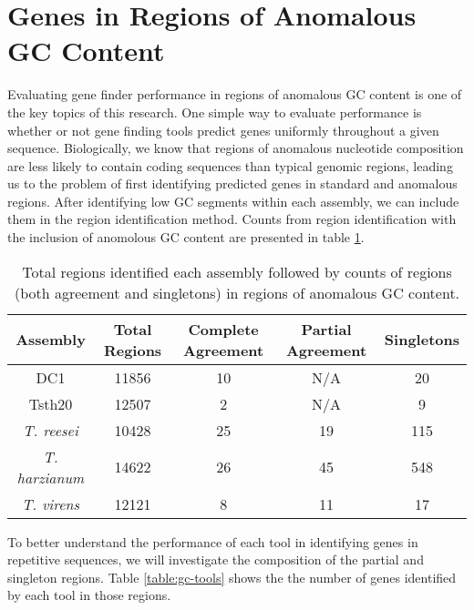 \section{Genes in Regions of Anomalous GC Content}

Evaluating gene finder performance in regions of anomalous GC content
is one of the key topics of this research. One simple way to evaluate
performance is whether or not gene finding tools predict genes
uniformly throughout a given sequence. Biologically, we know that
regions of anomalous nucleotide composition are less likely to contain
coding sequences than typical genomic regions, leading us to the
problem of first identifying predicted genes in standard and anomalous
regions. After identifying low GC segments within each assembly, we
can include them in the region identification method. Counts from
region identification with the inclusion of anomolous GC content are
presented in table \ref{table:gc-regions}.

\begin{table}[h!]
  \begin{center}
    \begin{tabular}{|c|c|c|c|c|}
      \hline
      Assembly & Total Regions & Complete Agreement & Partial Agreement & Singletons \\ \hline
      DC1 & 11856 & 10 & N/A & 20  \\ \hline
      Tsth20 & 12507 & 2 & N/A & 9  \\ \hline
      \textit{T. reesei} & 10428 & 25 & 19 & 115  \\ \hline
      \textit{T. harzianum} & 14622 & 26 & 45 & 548  \\ \hline
      \textit{T. virens} & 12121 & 8 & 11 & 17  \\ \hline
    \end{tabular}
  \end{center}
  \caption[Agreement of predictions in anomalous GC regions.]{Total
    regions identified each assembly followed by counts of regions
    (both agreement and singletons) in regions of anomalous GC
    content.}
  \label{table:gc-regions}
\end{table}

To better understand the performance of each tool in identifying genes
in repetitive sequences, we will investigate the composition of the
partial and singleton regions. Table \ref{table:gc-tools} shows the
the number of genes identified by each tool in those regions.

